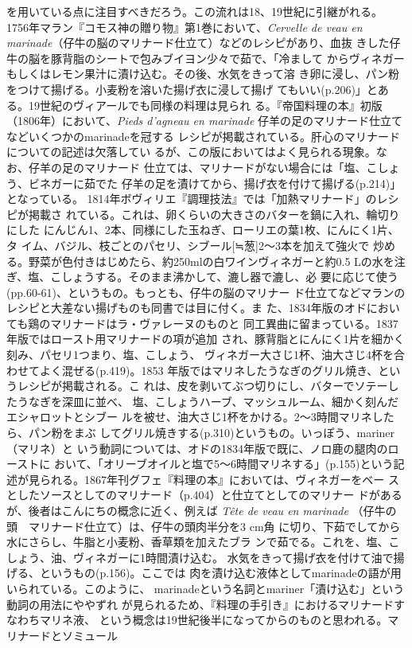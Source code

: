 {{{{  を用いている点に注目すべきだろう。この流れは18、19世紀に引継がれる。
  1756年マラン『コモス神の贈り物』第1巻において、\emph{Cervelle de veau
  en marinade}（仔牛の脳のマリナード仕立て）などのレシピがあり、血抜
  きした仔牛の脳を豚背脂のシートで包みブイヨン少々で茹で、「冷まして
  からヴィネガーもしくはレモン果汁に漬け込む。その後、水気をきって溶
  き卵に浸し、パン粉をつけて揚げる。小麦粉を溶いた揚げ衣に浸して揚げ
  てもいい(p.206)」とある。19世紀のヴィアールでも同様の料理は見られ
  る。『帝国料理の本』初版（1806年）において、\emph{Pieds d'agneau en
  marinade} 仔羊の足のマリナード仕立てなどいくつかのmarinadeを冠する
  レシピが掲載されている。肝心のマリナードについての記述は欠落してい
  るが、この版においてはよく見られる現象。なお、仔羊の足のマリナード
  仕立ては、マリナードがない場合には「塩、こしょう、ビネガーに茹でた
  仔羊の足を漬けてから、揚げ衣を付けて揚げる(p.214)」となっている。
  1814年ボヴィリエ『調理技法』では「加熱マリナード」のレシピが掲載さ
  れている。これは、卵くらいの大きさのバターを鍋に入れ、輪切りにした
  にんじん1、2本、同様にした玉ねぎ、ローリエの葉1枚、にんにく1片、タ
  イム、バジル、枝ごとのパセリ、シブール{[}≒葱{]}2〜3本を加えて強火で
  炒める。野菜が色付きはじめたら、約250mlの白ワインヴィネガーと約0.5
  Lの水を注ぎ、塩、こしょうする。そのまま沸かして、漉し器で漉し、必
  要に応じて使う(pp.60-61)、というもの。もっとも、仔牛の脳のマリナー
  ド仕立てなどマランのレシピと大差ない揚げものも同書では目に付く。ま
  た、1834年版のオドにおいても鶏のマリナードはラ・ヴァレーヌのものと
  同工異曲に留まっている。1837年版ではロースト用マリナードの項が追加
  され、豚背脂とにんにく1片を細かく刻み、パセリ1つまり、塩、こしょう、
  ヴィネガー大さじ1杯、油大さじ4杯を合わせてよく混ぜる(p.419)。1853
  年版ではマリネしたうなぎのグリル焼き、というレシピが掲載される。こ
  れは、皮を剥いてぶつ切りにし、バターでソテーしたうなぎを深皿に並べ、
  塩、こしょうハーブ、マッシュルーム、細かく刻んだエシャロットとシブー
  ルを被せ、油大さじ1杯をかける。2〜3時間マリネしたら、パン粉をまぶ
  してグリル焼きする(p.310)というもの。いっぽう、mariner（マリネ）と
  いう動詞については、オドの1834年版で既に、ノロ鹿の腿肉のローストに
  おいて、「オリーブオイルと塩で5〜6時間マリネする」(p.155)という記
  述が見られる。1867年刊グフェ『料理の本』においては、ヴィネガーをベー
  スとしたソースとしてのマリナード（p.404）と仕立てとしてのマリナー
  ドがあるが、後者はこんにちの概念に近く、例えば \emph{Tête de veau en
  marinade} （仔牛の頭　マリナード仕立て）は、仔牛の頭肉半分を3 cm角
  に切り、下茹でしてから水にさらし、牛脂と小麦粉、香草類を加えたブラ
  ンで茹でる。これを、塩、こしょう、油、ヴィネガーに1時間漬け込む。
  水気をきって揚げ衣を付けて油で揚げる、というもの(p.156)。ここでは
  肉を漬け込む液体としてmarinadeの語が用いられている。このように、
  marinadeという名詞とmariner「漬け込む」という動詞の用法にややずれ
  が見られるため、『料理の手引き』におけるマリナードすなわちマリネ液、
  という概念は19世紀後半になってからのものと思われる。}}{マリナードとソミュール}}\label{marinades-et-saumures}}

